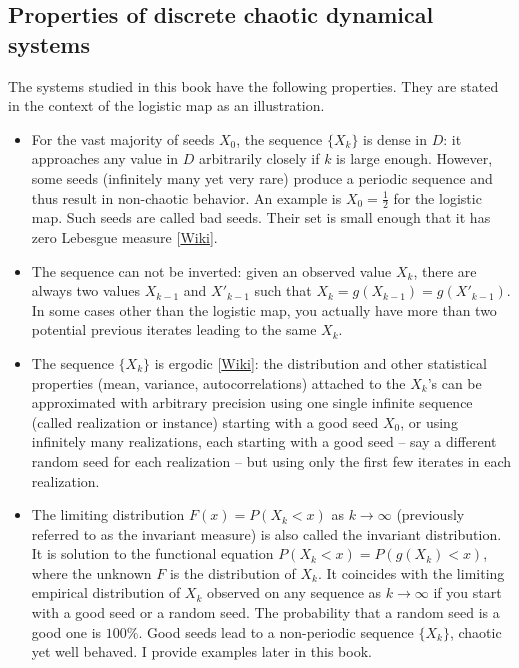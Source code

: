 \documentclass[oneside,10pt]{book}
\begin{document}
\subsection{Properties of discrete chaotic dynamical systems}\label{thorium}
The systems studied in this book have the following properties. They are stated in the context of the logistic map as an illustration. \vspace{1ex}
\begin{itemize}
\item For the vast majority of seeds $X_0$,
 the sequence $\{X_k\}$ is dense in $D$: it approaches any value in $D$ arbitrarily closely if $k$ is large enough.
However, some seeds (infinitely many yet very rare) produce a periodic sequence and thus result in non-chaotic behavior. An example is
 $X_0=\frac{1}{2}$ for the logistic map. Such seeds are called \textcolor{index}{bad seeds}. Their set is small enough that it has zero \textcolor{index}{Lebesgue measure} [\href{https://en.wikipedia.org/wiki/Lebesgue_measure}{Wiki}].
\item The sequence can not be inverted: given an observed value $X_k$, there are always two values $X_{k-1}$ and $X'_{k-1}$ such
 that $X_k=g(X_{k-1}) = g(X'_{k-1})$. In some cases other than the logistic map, you actually have more than two potential previous iterates leading to the same $X_k$.
\item The sequence $\{X_k\}$ is \textcolor{index}{ergodic} [\href{https://en.wikipedia.org/wiki/Ergodicity}{Wiki}]:
 the distribution and other statistical properties (mean, variance, autocorrelations) attached to the $X_k$'s can be approximated with arbitrary precision  using one single infinite sequence (called realization or instance) starting with a good seed $X_0$, or using infinitely many realizations, each starting with a good seed -- say a different random seed for each realization -- but using only the first few iterates in each realization.
\item The limiting distribution $F(x)=P(X_k<x)$ as $k\rightarrow\infty$ (previously referred to as the invariant measure) is  also called
 the \textcolor{index}{invariant distribution}. It is  solution to the functional
 equation $P(X_k<x) = P(g(X_k)<x)$, where the unknown $F$ is the distribution of $X_k$. It coincides
with the limiting \textcolor{index}{empirical distribution} of $X_k$ observed on any sequence as
 $k\rightarrow\infty$ if you start with a \textcolor{index}{good seed} or a random seed. The probability that a random seed is a good one is $100\%$. Good seeds lead to a non-periodic sequence $\{X_k\}$, chaotic yet well behaved. I provide examples later in this book.

\end{itemize}
\end{document}
